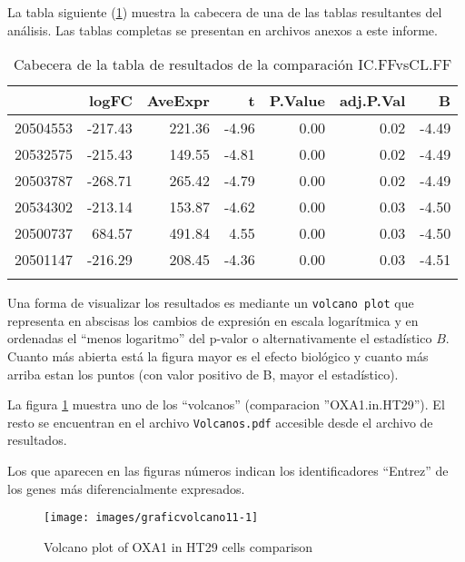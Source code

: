 \documentclass[a4paper]{article}\usepackage[]{graphicx}\usepackage[]{color}
\makeatletter
\def\maxwidth{ %
  \ifdim\Gin@nat@width>\linewidth
    \linewidth
  \else
    \Gin@nat@width
  \fi
}
\newenvironment{knitrout}{}{} %
\makeatother
\begin{document}
La tabla siguiente (\ref{topTable1}) muestra la cabecera de una de las
tablas resultantes del análisis. Las tablas completas se presentan en
archivos anexos a este informe.

\begin{longtable}{rrrrrrr}
  \hline
 & logFC & AveExpr & t & P.Value & adj.P.Val & B \\ 
  \hline
20504553 & -217.43 & 221.36 & -4.96 & 0.00 & 0.02 & -4.49 \\ 
  20532575 & -215.43 & 149.55 & -4.81 & 0.00 & 0.02 & -4.49 \\ 
  20503787 & -268.71 & 265.42 & -4.79 & 0.00 & 0.02 & -4.49 \\ 
  20534302 & -213.14 & 153.87 & -4.62 & 0.00 & 0.03 & -4.50 \\ 
  20500737 & 684.57 & 491.84 & 4.55 & 0.00 & 0.03 & -4.50 \\ 
  20501147 & -216.29 & 208.45 & -4.36 & 0.00 & 0.03 & -4.51 \\ 
   \hline
\hline
\caption{Cabecera de la tabla de resultados de la comparación IC.FFvsCL.FF} 
\label{topTable1}
\end{longtable}



Una forma de visualizar los resultados es mediante un \texttt{volcano
  plot} que representa en abscisas los cambios de expresión en escala
logarítmica y en ordenadas el ``menos logaritmo'' del p-valor o
alternativamente el estadístico $B$. Cuanto más abierta está la figura mayor es el efecto biológico y cuanto más arriba estan los puntos (con valor positivo de B, mayor el estadístico).

La figura \ref{fig:volcano11} muestra uno de los ``volcanos'' (comparacion
''OXA1.in.HT29''). El resto se encuentran en el archivo
\texttt{Volcanos.pdf} accesible desde el archivo de resultados. 

Los que aparecen en las figuras números indican los identificadores
``Entrez'' de los genes más diferencialmente expresados.

\begin{knitrout}
\color{fgcolor}\begin{figure}
\texttt{[image: images/graficvolcano11-1]} \caption[Volcano plot of OXA1 in HT29 cells comparison]{Volcano plot of OXA1 in HT29 cells comparison}\label{fig:volcano11}
\end{figure}


\end{knitrout}
\end{document}

